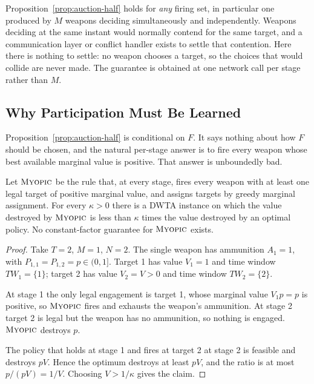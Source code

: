 \begin{remark}
\label{rem:auction-kills-pileon}
Proposition~\ref{prop:auction-half} holds for \emph{any} firing set, in
particular one produced by $M$ weapons deciding simultaneously and
independently. Weapons deciding at the same instant would normally contend
for the same target, and a communication layer or conflict handler exists to
settle that contention. Here there is nothing to settle: no weapon chooses a
target, so the choices that would collide are never made. The guarantee is
obtained at one network call per stage rather than $M$.
\end{remark}

\subsection{Why Participation Must Be Learned}
\label{sec:participation-theory}

Proposition~\ref{prop:auction-half} is conditional on $F$. It says nothing
about how $F$ should be chosen, and the natural per-stage answer is to fire
every weapon whose best available marginal value is positive. That answer is
unboundedly bad.

\begin{proposition}
\label{prop:myopic-gap}
Let $\textsc{Myopic}$ be the rule that, at every stage, fires every weapon
with at least one legal target of positive marginal value, and assigns
targets by greedy marginal assignment. For every $\kappa > 0$ there is a DWTA instance on
which the value destroyed by $\textsc{Myopic}$ is less than $\kappa$ times
the value destroyed by an optimal policy. No constant-factor guarantee for
$\textsc{Myopic}$ exists.
\end{proposition}
\begin{proof}
Take $T=2$, $M=1$, $N=2$. The single weapon has ammunition $A_1 = 1$, with
$P_{1,1}=P_{1,2}=p \in (0,1]$. Target 1
has value $V_1 = 1$ and time window $TW_1 = \{1\}$; target 2 has value
$V_2 = V > 0$ and time window $TW_2 = \{2\}$.

At stage 1 the only legal engagement is target 1, whose marginal value
$V_1 p = p$ is positive, so $\textsc{Myopic}$ fires and exhausts the
weapon's ammunition. At stage 2 target 2 is legal but the weapon has no
ammunition, so nothing is engaged. $\textsc{Myopic}$ destroys $p$.

The policy that holds at stage 1 and fires at target 2 at stage 2 is
feasible and destroys $pV$. Hence the optimum destroys at least $pV$, and
the ratio is at most $p/(pV) = 1/V$. Choosing $V > 1/\kappa$ gives the
claim.
\end{proof}

